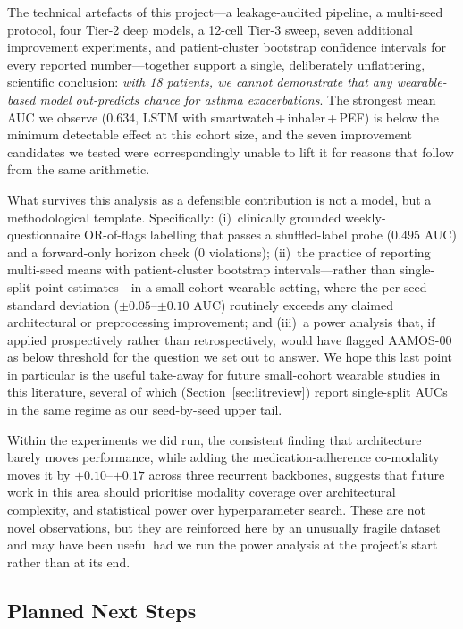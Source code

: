 \documentclass[11pt,a4paper]{article}
\begin{document}
The technical artefacts of this project---a leakage-audited pipeline, a
multi-seed protocol, four Tier-2 deep models, a 12-cell Tier-3 sweep,
seven additional improvement experiments, and patient-cluster bootstrap
confidence intervals for every reported number---together support a
single, deliberately unflattering, scientific conclusion: \emph{with 18
patients, we cannot demonstrate that any wearable-based model
out-predicts chance for asthma exacerbations}.  The strongest mean AUC
we observe (0.634, LSTM with smartwatch\,+\,inhaler\,+\,PEF) is below
the minimum detectable effect at this cohort size, and the seven
improvement candidates we tested were correspondingly unable to lift it
for reasons that follow from the same arithmetic.

What survives this analysis as a defensible contribution is not a
model, but a methodological template.  Specifically: (i)~clinically
grounded weekly-questionnaire OR-of-flags labelling that passes a
shuffled-label probe ($0.495$ AUC) and a forward-only horizon check
($0$ violations); (ii)~the practice of reporting multi-seed means with
patient-cluster bootstrap intervals---rather than single-split point
estimates---in a small-cohort wearable setting, where the per-seed
standard deviation ($\pm0.05$--$\pm0.10$ AUC) routinely exceeds any
claimed architectural or preprocessing improvement; and (iii)~a power
analysis that, if applied prospectively rather than retrospectively,
would have flagged AAMOS-00 as below threshold for the question we
set out to answer.  We hope this last point in particular is the
useful take-away for future small-cohort wearable studies in this
literature, several of which (Section~\ref{sec:litreview}) report
single-split AUCs in the same regime as our seed-by-seed upper tail.

Within the experiments we did run, the consistent finding that
architecture barely moves performance, while adding the
medication-adherence co-modality moves it by
${+}0.10$--${+}0.17$ across three recurrent backbones, suggests that
future work in this area should prioritise modality coverage over
architectural complexity, and statistical power over hyperparameter
search.  These are not novel observations, but they are reinforced
here by an unusually fragile dataset and may have been useful had we
run the power analysis at the project's start rather than at its end.

\subsection{Planned Next Steps}
\end{document}
